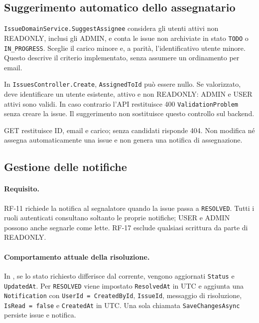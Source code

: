 \documentclass[12pt,a4paper]{article}
\begin{document}
\subsection{Suggerimento automatico dello assegnatario}

\texttt{IssueDomainService.SuggestAssignee} considera gli utenti attivi non READONLY, inclusi gli ADMIN, e conta le issue non archiviate in stato \texttt{TODO} o \texttt{IN\_PROGRESS}. Sceglie il carico minore e, a parità, l'identificativo utente minore. Questo descrive il criterio implementato, senza assumere un ordinamento per email.

In \texttt{IssuesController.Create}, \texttt{AssignedToId} può essere nullo. Se valorizzato, deve identificare un utente esistente, attivo e non READONLY: ADMIN e USER attivi sono validi. In caso contrario l'API restituisce 400 \texttt{ValidationProblem} senza creare la issue. Il suggerimento non sostituisce questo controllo sul backend.

GET  restituisce ID, email e carico; senza candidati risponde 404. Non modifica né assegna automaticamente una issue e non genera una notifica di assegnazione.

\subsection{Gestione delle notifiche}

\paragraph{Requisito.}
RF-11 richiede la notifica al segnalatore quando la issue passa a \texttt{RESOLVED}. Tutti i ruoli autenticati consultano soltanto le proprie notifiche; USER e ADMIN possono anche segnarle come lette. RF-17 esclude qualsiasi scrittura da parte di READONLY.

\paragraph{Comportamento attuale della risoluzione.}
In , se lo stato richiesto differisce dal corrente, vengono aggiornati \texttt{Status} e \texttt{UpdatedAt}. Per \texttt{RESOLVED} viene impostato \texttt{ResolvedAt} in UTC e aggiunta una \texttt{Notification} con \texttt{UserId = CreatedById}, \texttt{IssueId}, messaggio di risoluzione, \texttt{IsRead = false} e \texttt{CreatedAt} in UTC. Una sola chiamata \texttt{SaveChangesAsync} persiste issue e notifica.
\end{document}
